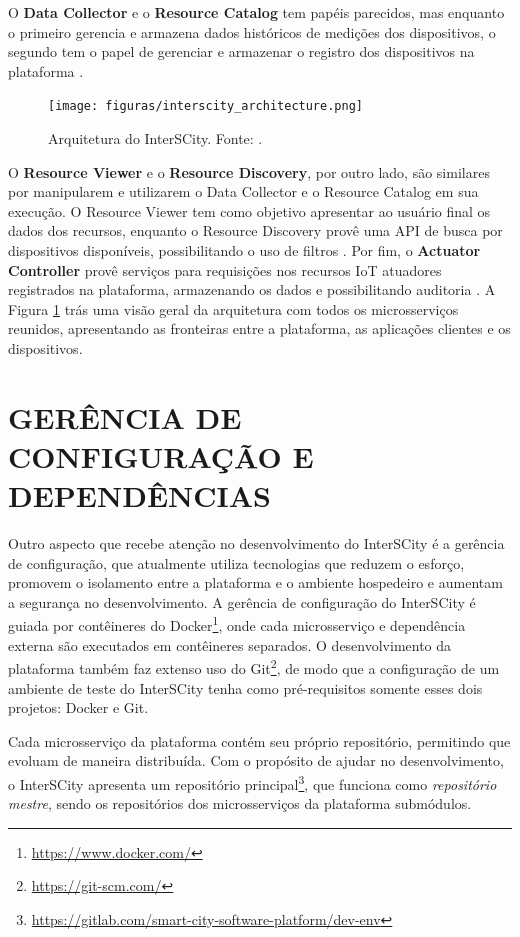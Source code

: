 O \textbf{Data Collector} e o \textbf{Resource Catalog} tem papéis parecidos,
mas enquanto o primeiro gerencia e armazena dados históricos de medições dos
dispositivos, o segundo tem o papel de gerenciar e armazenar o registro dos
dispositivos na plataforma \cite{delesposte2017}.

\begin{figure}
  \centering
    \texttt{[image: figuras/interscity\_architecture.png]}
    \caption{Arquitetura do InterSCity. Fonte: .}
  \label{fig:interscity-architecture}
\end{figure}


O \textbf{Resource Viewer} e o \textbf{Resource Discovery}, por outro lado,
são similares por manipularem e utilizarem o Data Collector e o Resource
Catalog em sua execução. O Resource Viewer tem como objetivo apresentar ao
usuário final os dados dos recursos, enquanto o Resource Discovery provê uma API
 de busca por dispositivos disponíveis, possibilitando o uso de filtros
\cite{delesposte2017}. Por fim, o \textbf{Actuator Controller} provê serviços
para requisições nos recursos IoT atuadores registrados na plataforma,
armazenando os dados e possibilitando auditoria \cite{delesposte2017}. A Figura
\ref{fig:interscity-architecture} trás uma visão geral da arquitetura com todos
os microsserviços reunidos, apresentando as fronteiras entre a plataforma,
as aplicações clientes e os dispositivos.

\section{GERÊNCIA DE CONFIGURAÇÃO E DEPENDÊNCIAS}

Outro aspecto que recebe atenção no desenvolvimento do InterSCity é a gerência
de configuração, que atualmente utiliza tecnologias que reduzem o esforço,
promovem o isolamento entre a plataforma e o ambiente hospedeiro
e aumentam a segurança no desenvolvimento. A gerência de configuração do
InterSCity é guiada por contêineres do
Docker\footnote{\url{https://www.docker.com/}}, onde cada microsserviço e
dependência externa são executados em contêineres separados. O desenvolvimento
da plataforma também faz extenso uso do
Git\footnote{\url{https://git-scm.com/}}, de modo que a configuração de um
ambiente de teste do InterSCity tenha como pré-requisitos somente esses
dois projetos: Docker e Git.

Cada microsserviço da plataforma contém seu próprio repositório, permitindo que
evoluam de maneira distribuída. Com o propósito de ajudar no desenvolvimento,
o InterSCity apresenta um repositório
principal\footnote{\url{https://gitlab.com/smart-city-software-platform/dev-env}},
que funciona como \textit{repositório mestre}, sendo os repositórios dos
microsserviços da plataforma submódulos.

